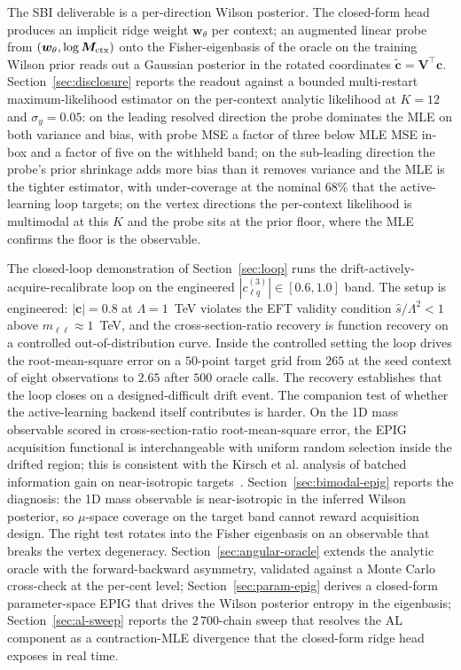 \documentclass[11pt,a4paper]{article}
\begin{document}
The SBI deliverable is a per-direction Wilson posterior. The closed-form head produces an implicit ridge weight $\bm{w}_\theta$ per context; an augmented linear probe from $(\bm{w}_\theta, \log \bm{M}_{\rm ctx})$ onto the Fisher-eigenbasis of the oracle on the training Wilson prior reads out a Gaussian posterior in the rotated coordinates $\tilde{\bm{c}} = \bm{V}^\top \bm{c}$. Section~\ref{sec:disclosure} reports the readout against a bounded multi-restart maximum-likelihood estimator on the per-context analytic likelihood at $K = 12$ and $\sigma_y = 0.05$: on the leading resolved direction the probe dominates the MLE on both variance and bias, with probe MSE a factor of three below MLE MSE in-box and a factor of five on the withheld band; on the sub-leading direction the probe's prior shrinkage adds more bias than it removes variance and the MLE is the tighter estimator, with under-coverage at the nominal $68\%$ that the active-learning loop targets; on the vertex directions the per-context likelihood is multimodal at this $K$ and the probe sits at the prior floor, where the MLE confirms the floor is the observable.

The closed-loop demonstration of Section~\ref{sec:loop} runs the drift-actively-acquire-recalibrate loop on the engineered $|c_{\ell q}^{(3)}| \in [0.6, 1.0]$ band. The setup is engineered: $|\bm{c}| = 0.8$ at $\Lambda = 1$~TeV violates the EFT validity condition $\hat{s}/\Lambda^2 < 1$ above $m_{\ell\ell} \approx 1$~TeV, and the cross-section-ratio recovery is function recovery on a controlled out-of-distribution curve. Inside the controlled setting the loop drives the root-mean-square error on a $50$-point target grid from $265$ at the seed context of eight observations to $2.65$ after $500$ oracle calls. The recovery establishes that the loop closes on a designed-difficult drift event. The companion test of whether the active-learning backend itself contributes is harder. On the 1D mass observable scored in cross-section-ratio root-mean-square error, the EPIG acquisition functional is interchangeable with uniform random selection inside the drifted region; this is consistent with the Kirsch et al. analysis of batched information gain on near-isotropic targets~\cite{Kirsch:2019batchbald}. Section~\ref{sec:bimodal-epig} reports the diagnosis: the 1D mass observable is near-isotropic in the inferred Wilson posterior, so $\mu$-space coverage on the target band cannot reward acquisition design. The right test rotates into the Fisher eigenbasis on an observable that breaks the vertex degeneracy. Section~\ref{sec:angular-oracle} extends the analytic oracle with the forward-backward asymmetry, validated against a Monte Carlo cross-check at the per-cent level; Section~\ref{sec:param-epig} derives a closed-form parameter-space EPIG that drives the Wilson posterior entropy in the eigenbasis; Section~\ref{sec:al-sweep} reports the $2\,700$-chain sweep that resolves the AL component as a contraction-MLE divergence that the closed-form ridge head exposes in real time.
\end{document}
